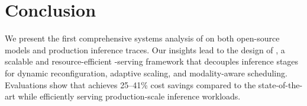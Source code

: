 \section{Conclusion}

We present the first comprehensive systems analysis of \lmms{} on both open-source models and production \lmm{} inference traces.
Our insights lead to the design of \sysname{}, a scalable and resource-efficient \lmm{}-serving framework that decouples inference stages for dynamic reconfiguration, adaptive scaling, and modality-aware scheduling.
Evaluations show that \sysname{} achieves 25--41\% cost savings compared to the state-of-the-art while efficiently serving production-scale \lmm{} inference workloads.